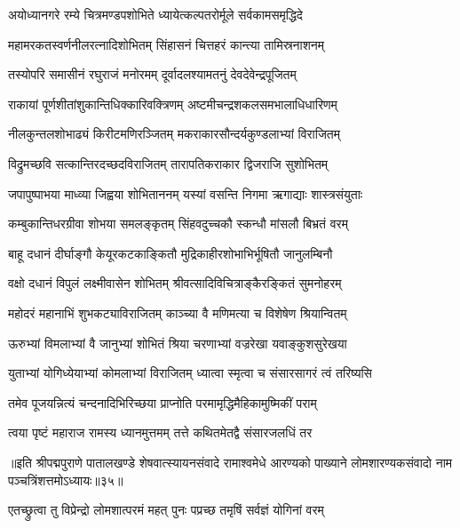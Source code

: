 \twolineshloka
{अयोध्यानगरे रम्ये चित्रमण्डपशोभिते}
{ध्यायेत्कल्पतरोर्मूले सर्वकामसमृद्धिदे}%

\twolineshloka
{महामरकतस्वर्णनीलरत्नादिशोभितम्}
{सिंहासनं चित्तहरं कान्त्या तामिस्रनाशनम्}%

\twolineshloka
{तस्योपरि समासीनं रघुराजं मनोरमम्}
{दूर्वादलश्यामतनुं देवदेवेन्द्रपूजितम्}%

\twolineshloka
{राकायां पूर्णशीतांशुकान्तिधिक्कारिवक्त्रिणम्}
{अष्टमीचन्द्रशकलसमभालाधिधारिणम्}%

\twolineshloka
{नीलकुन्तलशोभाढ्यं किरीटमणिरञ्जितम्}
{मकराकारसौन्दर्यकुण्डलाभ्यां विराजितम्}%

\twolineshloka
{विद्रुमच्छवि सत्कान्तिरदच्छदविराजितम्}
{तारापतिकराकार द्विजराजि सुशोभितम्}%

\twolineshloka
{जपापुष्पाभया माध्व्या जिह्वया शोभिताननम्}
{यस्यां वसन्ति निगमा ऋगाद्याः शास्त्रसंयुताः}%

\twolineshloka
{कम्बुकान्तिधरग्रीवा शोभया समलङ्कृतम्}
{सिंहवदुच्चकौ स्कन्धौ मांसलौ बिभ्रतं वरम्}%

\twolineshloka
{बाहू दधानं दीर्घाङ्गौ केयूरकटकाङ्कितौ}
{मुद्रिकाहीरशोभाभिर्भूषितौ जानुलम्बिनौ}%

\twolineshloka
{वक्षो दधानं विपुलं लक्ष्मीवासेन शोभितम्}
{श्रीवत्सादिविचित्राङ्कैरङ्कितं सुमनोहरम्}%

\twolineshloka
{महोदरं महानाभिं शुभकट्याविराजितम्}
{काञ्च्या वै मणिमत्या च विशेषेण श्रियान्वितम्}%

\twolineshloka
{ऊरुभ्यां विमलाभ्यां वै जानुभ्यां शोभितं श्रिया}
{चरणाभ्यां वज्ररेखा यवाङ्कुशसुरेखया}%

\twolineshloka
{युताभ्यां योगिध्येयाभ्यां कोमलाभ्यां विराजितम्}
{ध्यात्वा स्मृत्वा च संसारसागरं त्वं तरिष्यसि}%

\twolineshloka
{तमेव पूजयन्नित्यं चन्दनादिभिरिच्छया}
{प्राप्नोति परमामृद्धिमैहिकामुष्मिकीं पराम्}%

\twolineshloka
{त्वया पृष्टं महाराज रामस्य ध्यानमुत्तमम्}
{तत्ते कथितमेतद्वै संसारजलधिं तर}%

{॥इति श्रीपद्मपुराणे पातालखण्डे शेषवात्स्यायनसंवादे रामाश्वमेधे आरण्यको पाख्याने लोमशारण्यकसंवादो नाम पञ्चत्रिंशत्तमोऽध्यायः॥३५॥}

\resetShloka


\twolineshloka
{एतच्छ्रुत्वा तु विप्रेन्द्रो लोमशात्परमं महत्}
{पुनः पप्रच्छ तमृषिं सर्वज्ञं योगिनां वरम्}%


